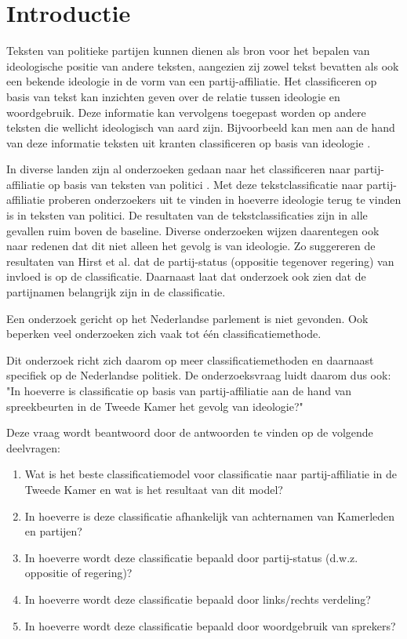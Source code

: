 \section{Introductie}
\label{sec:intro}
Teksten van politieke partijen kunnen dienen als bron voor het bepalen van ideologische positie van andere teksten, aangezien zij zowel tekst bevatten als ook een bekende ideologie in de vorm van een partij-affiliatie. Het classificeren op basis van tekst kan inzichten geven over de relatie tussen ideologie en woordgebruik. Deze informatie kan vervolgens toegepast worden op andere teksten die wellicht ideologisch van aard zijn. Bijvoorbeeld kan men aan de hand van deze informatie teksten uit kranten classificeren op basis van ideologie \cite{DBLP:journals/corr/Biessmann16,Hirst_textto}.\par
In diverse landen zijn al onderzoeken gedaan naar het classificeren naar partij-affiliatie op basis van teksten van politici \cite{Ferreira2016UsingTT,DBLP:journals/corr/Biessmann16}. Met deze tekstclassificatie naar partij-affiliatie proberen onderzoekers uit te vinden in hoeverre ideologie terug te vinden is in teksten van politici. De resultaten van de tekstclassificaties zijn in alle gevallen ruim boven de baseline. Diverse onderzoeken wijzen daarentegen ook naar redenen dat dit niet alleen het gevolg is van ideologie. Zo suggereren de  resultaten van Hirst et al. \cite{Hirst_textto} dat de partij-status (oppositie tegenover regering) van invloed is op de classificatie. Daarnaast laat dat onderzoek ook zien dat de partijnamen belangrijk zijn in de classificatie.\par
Een onderzoek gericht op het Nederlandse parlement is niet gevonden. Ook beperken veel onderzoeken zich vaak tot één classificatiemethode.\par
Dit onderzoek richt zich daarom op meer classificatiemethoden en daarnaast specifiek op de Nederlandse politiek. De onderzoeksvraag luidt daarom dus ook: "In hoeverre is classificatie op basis van partij-affiliatie aan de hand van spreekbeurten in de Tweede Kamer het gevolg van ideologie?"\par
Deze vraag wordt beantwoord door de antwoorden te vinden op de volgende deelvragen:
\begin{enumerate}
    \item Wat is het beste classificatiemodel voor classificatie naar partij-affiliatie in de Tweede Kamer en wat is het resultaat van dit model?
    \item In hoeverre is deze classificatie afhankelijk van achternamen van Kamerleden en partijen?
    \item In hoeverre wordt deze classificatie bepaald door partij-status (d.w.z. oppositie of regering)?
    \item In hoeverre wordt deze classificatie bepaald door links/rechts verdeling?
    \item In hoeverre wordt deze classificatie bepaald door woordgebruik van sprekers?
\end{enumerate}
